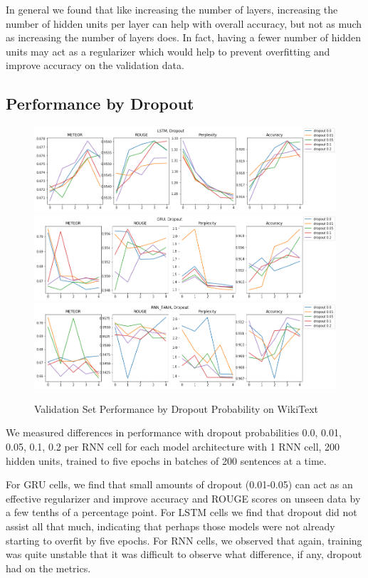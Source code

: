 \documentclass[a4paper]{article}
\begin{document}
In general we found that like increasing the number of layers,
increasing the number of hidden units per layer can help with overall accuracy,
but not as much as increasing the number of layers does. In fact, having a fewer
number of hidden units may act as a regularizer which would help to prevent
overfitting and improve accuracy on the validation data.

\subsection{Performance by Dropout}
\label{sec:perf_by_dropout}

\begin{figure}[!ht]
\includegraphics[width=0.8\columnwidth]{sr-perf-by-dropout-lstm}
\includegraphics[width=0.8\columnwidth]{sr-perf-by-dropout-gru}
\includegraphics[width=0.8\columnwidth]{sr-perf-by-dropout-rnn}
\centering
\caption{Validation Set Performance by Dropout Probability on WikiText}
\end{figure}

We measured differences in performance with dropout probabilities
0.0, 0.01, 0.05, 0.1, 0.2 per RNN cell for each model architecture with
1 RNN cell, 200 hidden units, trained to five epochs in batches of 200
sentences at a time.

For GRU cells, we find that small amounts of dropout (0.01-0.05) can act
as an effective regularizer and improve accuracy and ROUGE scores on unseen
data by a few tenths of a percentage point. For LSTM cells we find that
dropout did not assist all that much, indicating that perhaps those models were
not already starting to overfit by five epochs. For RNN cells, we observed
that again, training was quite unstable that it was difficult to observe what
difference, if any, dropout had on the metrics.
\end{document}
